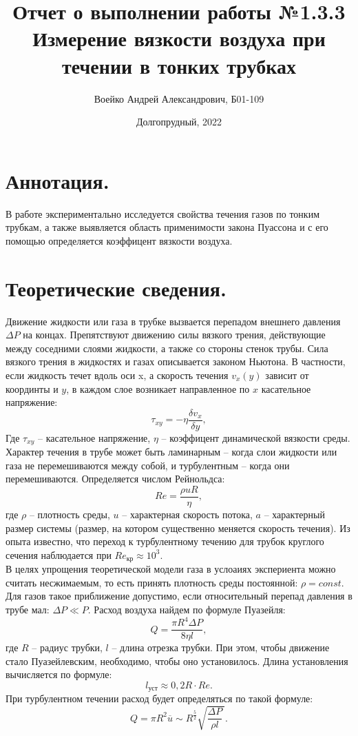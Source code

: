 \documentclass[a4paper,11pt]{article}
\title{Отчет о выполнении работы №1.3.3\\Измерение вязкости воздуха при течении в тонких трубках}
\author{Воейко Андрей Александрович, Б01-109}
\date{Долгопрудный, 2022}
\begin{document}
\maketitle
\newpage
\section{Аннотация.}
В работе экспериментально исследуется свойства течения газов по тонким трубкам, а также выявляется область применимости закона Пуассона и с его помощью определяется коэффицент вязкости воздуха.
\section{Теоретические сведения.}
Движение жидкости или газа в трубке вызвается перепадом внешнего давления $\Delta P$ на концах. Препятствуют движению силы вязкого трения, действующие между соседними слоями жидкости, а также со стороны стенок трубы. Сила вязкого трения в жидкостях и газах описывается законом Ньютона. В частности, если жидкость течет вдоль оси x, а скорость течения $v_{x}(y)$ зависит от координты и $y$, в каждом слое возникает направленное по $x$ касательное напряжение:
\begin{equation}    \label{eq1}
  \tau_{xy} = -\eta \frac{\delta v_{x}}{\delta y},
\end{equation}
Где $\tau_{xy}$ -- касательное напряжение, $\eta$ -- коэффицент динамической вязкости среды.
Характер течения в трубе может быть ламинарным -- когда слои жидкости или газа не перемешиваются между собой, и турбулентным -- когда они перемешиваются. Определяется числом Рейнольдса:
\begin{equation}    \label{eq2}
  Re = \frac{\rho u R}{\eta},
\end{equation}
где $\rho$ -- плотность среды, $u$ -- характерная скорость потока, $a$ -- характерный размер системы (размер, на котором существенно меняется скорость течения). Из опыта известно, что переход к турбулентному течению для трубок круглого сечения наблюдается при $Re_{кр} \approx 10^{3}$.\\
В целях упрощения теоретической модели газа в услоаиях экспериента можно считать несжимаемым, то есть принять плотность среды постоянной: $\rho = const$. Для газов такое приближение допустимо, если относительный перепад давления в трубе мал: $\Delta P \ll P$.
Расход воздуха найдем по формуле Пуазейля:
\begin{equation}    \label{eq3}
  Q = \frac{\pi R^{4} \Delta P}{8 \eta l},
\end{equation}
где $R$ -- радиус трубки, $l$ -- длина отрезка трубки. При этом, чтобы движение стало Пуазейлевским, необходимо, чтобы оно установилось. Длина установления вычисляется по формуле:
\begin{equation}    \label{eq4}
  l_{уст} \approx 0,2 R \cdot Re.
\end{equation}
При турбулентном течении расход будет определяться по такой формуле:
\begin{equation}    \label{eq5}
  Q = \pi R^{2} \overline {u} \sim R^{\frac{5}{2}} \sqrt {\frac{\Delta P}{\rho l}\ }.
\end{equation}
\end{document}
